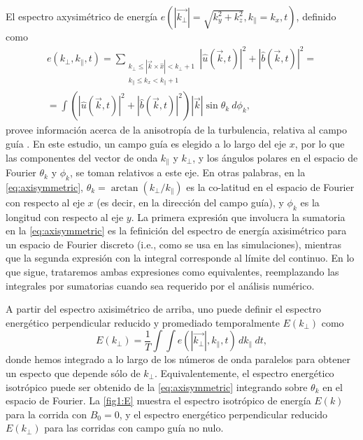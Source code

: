 El espectro axysimétrico de energía $e(|\vec{k_\perp}| =
\sqrt{k_y^2+k_z^2}, k_\parallel = k_x, t)$, definido como
\begin{equation}\label{eq:axisymmetric}
\begin{split}  e(k_\perp, k_\parallel, t) = \sum_{\substack{k_\perp \leq |\vec{k}\times\hat{x}| < k_\perp+1 \\ k_\parallel \leq k_x < k_\parallel +1}} |\hat{u}(\vec{k},t)|^2 +|\hat{b}(\vec{k},t)|^2 = \\ = \int \left(|\hat{u}(\vec{k},t)|^2 +|\hat{b}(\vec{k},t)|^2\right) |\vec{k}| \sin \theta_k~d\phi_k,
\end{split}
\end{equation}
provee información acerca de la anisotropía de la turbulencia, relativa al campo guía \cite{mininni_isotropization_2012}. En este estudio, un campo guía es elegido a lo largo del eje $x$, por lo que las componentes del vector de onda $k_\parallel$ y $k_\perp$, y los ángulos polares en el espacio de Fourier $\theta_k$ y $\phi_k$, se toman relativos a este eje.
En otras palabras, en la \cref{eq:axisymmetric}, %
$\theta_k = \arctan(k_\perp/k_\parallel)$ es la co-latitud en el espacio de Fourier con respecto al eje $x$ (es decir, en la dirección del campo guía), y $\phi_k$ es la longitud con respecto al eje $y$. La primera expresión que involucra la sumatoria en la \cref{eq:axisymmetric} es la fefinición del espectro de energía axisimétrico para un espacio de Fourier discreto (i.e., como se usa en las simulaciones), mientras que la segunda expresión con la integral corresponde al límite del continuo. En lo que sigue, trataremos ambas expresiones como equivalentes, reemplazando las integrales por sumatorias cuando sea requerido por el análisis numérico.

A partir del espectro axisimétrico de arriba, uno puede definir el espectro energético perpendicular reducido y promediado temporalmente $E(k_\perp)$
\cite{mininni_isotropization_2012} como
\begin{equation}\label{eq:reducedspectrum}
  E\left(k_\perp\right) = \frac{1}{T}\int\int e(|\vec{k_\perp}|,
  k_\parallel, t) \, dk_\parallel~dt,
\end{equation}
donde hemos integrado a lo largo de los números de onda paralelos para
obtener un especto que depende sólo de $k_\perp$. Equivalentemente, el
espectro energético isotrópico puede ser obtenido de la
\cref{eq:axisymmetric} integrando sobre $\theta_k$ en el espacio de
Fourier. La \cref{fig1:E} muestra el espectro isotrópico de energía
$E(k)$ para la corrida con $B_0=0$, y el espectro energético
perpendicular reducido $E(k_\perp)$ para las corridas con campo guía
no nulo.

